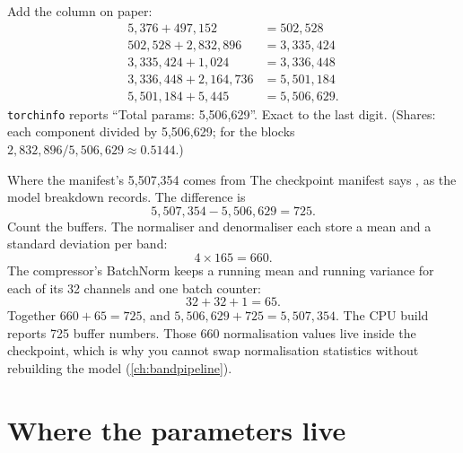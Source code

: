 Add the column on paper:
\begin{align*}
5{,}376 + 497{,}152 &= 502{,}528\\
502{,}528 + 2{,}832{,}896 &= 3{,}335{,}424\\
3{,}335{,}424 + 1{,}024 &= 3{,}336{,}448\\
3{,}336{,}448 + 2{,}164{,}736 &= 5{,}501{,}184\\
5{,}501{,}184 + 5{,}445 &= 5{,}506{,}629 .
\end{align*}
\texttt{torchinfo} reports ``Total params: 5,506,629''. Exact to the last digit. (Shares: each component
divided by 5,506,629; for the blocks $2{,}832{,}896 / 5{,}506{,}629 \approx 0.5144$.)

\begin{worked}[label={we:params:buffers}]{Where the manifest's 5,507,354 comes from}
The checkpoint manifest says , as the model breakdown
records. The difference is
\[
5{,}507{,}354 - 5{,}506{,}629 = 725 .
\]
Count the buffers. The normaliser and denormaliser each store a mean and a standard deviation per
band:
\[
4 \times 165 = 660 .
\]
The compressor's BatchNorm keeps a running mean and running variance for each of its 32 channels and
one batch counter:
\[
32 + 32 + 1 = 65 .
\]
Together $660 + 65 = 725$, and $5{,}506{,}629 + 725 = 5{,}507{,}354$. The CPU build reports 725 buffer
numbers. Those 660 normalisation values live inside the checkpoint, which is why you cannot swap
normalisation statistics without rebuilding the model (\cref{ch:bandpipeline}).
\end{worked}

\section{Where the parameters live}\label{sec:params:where}

